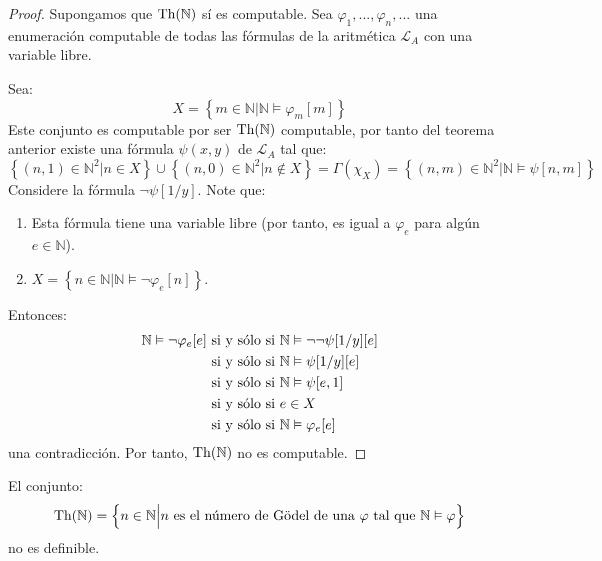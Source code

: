 \documentclass[12pt]{report}
\newcounter{it}
\theoremstyle{largebreak}
\begin{document}
    \begin{proof}
        Supongamos que $\textup{Th}(\mathbb{N})$ sí es computable. Sea $\varphi_1,...,\varphi_n,...$ una enumeración computable de todas las fórmulas de la aritmética $\mathcal{L}_{A}$ con una variable libre.

        Sea:
        \begin{equation*}
            X=\left\{m\in\mathbb{N}\Big|\mathbb{N}\vDash\varphi_m[m] \right\}
        \end{equation*}
        Este conjunto es computable por ser $\textup{Th}(\mathbb{N})$ computable, por tanto del teorema anterior existe una fórmula $\psi(x,y)$ de $\mathcal{L}_A$ tal que:
        \begin{equation*}
            \left\{(n,1)\in\mathbb{N}^2\Big|n\in X \right\}\cup\left\{(n,0)\in\mathbb{N}^2\Big|n\notin X \right\} =\Gamma(\chi_X)=\left\{(n,m)\in\mathbb{N}^2\Big|\mathbb{N}\vDash\psi[n,m] \right\}
        \end{equation*}
        Considere la fórmula $\neg\psi[1/y]$. Note que:
        \begin{enumerate}[label = \textit{(\arabic*)}]
            \item Esta fórmula tiene una variable libre (por tanto, es igual a $\varphi_e$ para algún $e\in\mathbb{N}$).
            \item $X=\left\{n\in\mathbb{N}\Big|\mathbb{N}\vDash\neg\varphi_e[n]\right\}$.
        \end{enumerate}
        Entonces:
        \begin{equation*}
            \begin{split}
                \mathbb{N}\vDash\neg\varphi_e[e]&\textup{ si y sólo si }\mathbb{N}\vDash\neg\neg\psi[1/y][e]\\
                &\textup{ si y sólo si }\mathbb{N}\vDash\psi[1/y][e]\\
                &\textup{ si y sólo si }\mathbb{N}\vDash\psi[e,1]\\
                &\textup{ si y sólo si }e\in X\\
                &\textup{ si y sólo si }\mathbb{N}\vDash\varphi_e[e]\\
            \end{split}
        \end{equation*}
        una contradicción. Por tanto, $\textup{Th}(\mathbb{N})$ no es computable.
    \end{proof}

    \begin{theor}
        El conjunto:
        \begin{equation*}
            \textup{Th}(\mathbb{N})=\left\{n\in\mathbb{N}\Big|n\textup{ es el número de Gödel de una }\varphi\textup{ tal que }\mathbb{N}\vDash\varphi \right\}
        \end{equation*}
        no es definible.
    \end{theor}
\end{document}
